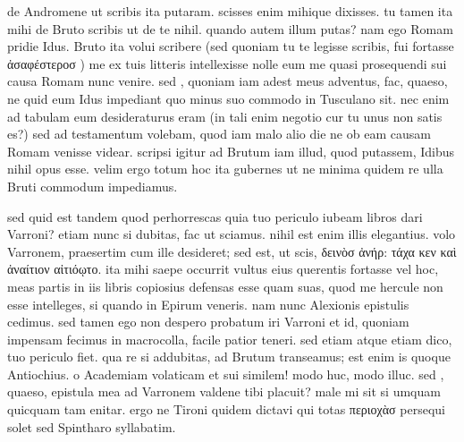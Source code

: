 


 de Andromene ut scribis ita putaram. scisses enim mihique dixisses. tu tamen ita mihi de Bruto scribis ut de te nihil. quando autem illum putas? nam ego Romam pridie Idus. Bruto ita volui scribere (sed quoniam tu te legisse scribis, fui fortasse ἀσαφέστεροσ ) me ex tuis litteris intellexisse nolle eum me quasi prosequendi sui causa Romam nunc venire. sed , quoniam iam adest meus adventus, fac, quaeso, ne quid eum Idus impediant quo minus suo commodo in Tusculano sit. nec enim ad tabulam eum desideraturus eram (in tali enim negotio cur tu unus non satis es?) sed ad testamentum volebam, quod iam malo alio die ne ob eam causam Romam venisse videar. scripsi igitur ad Brutum iam illud, quod putassem, Idibus nihil opus esse. velim ergo totum hoc ita gubernes ut ne minima quidem re ulla Bruti commodum impediamus.

 sed quid est tandem quod perhorrescas quia tuo periculo iubeam libros dari Varroni? etiam nunc si dubitas, fac ut sciamus. nihil est enim illis elegantius. volo Varronem, praesertim cum ille desideret; sed est, ut scis, δεινὸσ ἀνήρ: τάχα κεν καὶ ἀναίτιον αἰτιόῳτο. ita mihi saepe occurrit vultus eius querentis fortasse vel hoc, meas partis in iis libris copiosius defensas esse quam suas, quod me hercule non esse intelleges, si quando in Epirum veneris. nam nunc Alexionis epistulis cedimus. sed tamen ego non despero probatum iri Varroni et id, quoniam impensam fecimus in macrocolla, facile patior teneri. sed etiam atque etiam dico, tuo periculo fiet. qua re si addubitas, ad Brutum transeamus; est enim is quoque Antiochius. o Academiam volaticam et sui similem! modo huc, modo illuc. sed , quaeso, epistula mea ad Varronem valdene tibi placuit? male mi sit si umquam quicquam tam enitar. ergo ne Tironi quidem dictavi qui totas περιοχὰσ persequi solet sed Spintharo syllabatim.
